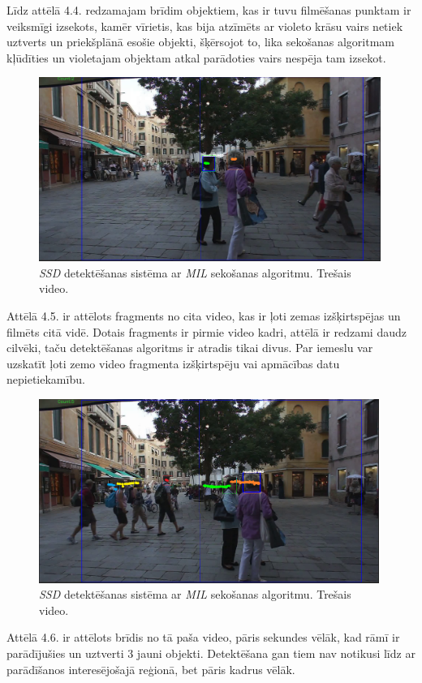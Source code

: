 Līdz attēlā 4.4. redzamajam brīdim objektiem, kas ir tuvu filmēšanas punktam ir veiksmīgi izsekots, kamēr vīrietis, kas bija atzīmēts ar violeto krāsu vairs netiek uztverts un priekšplānā esošie objekti, šķērsojot to, lika sekošanas algoritmam kļūdīties un violetajam objektam atkal parādoties vairs nespēja tam izsekot. 

\begin{figure}[h]%
	\centering
	\includegraphics[height=6cm]{images/ssd5.png} %
	\caption{\textit{SSD} detektēšanas sistēma ar \textit{MIL} sekošanas algoritmu. Trešais video.}%
	\label{fig:example}%
\end{figure}

Attēlā 4.5. ir attēlots fragments no cita video, kas ir ļoti zemas izšķirtspējas un filmēts citā vidē. Dotais fragments ir pirmie video kadri, attēlā ir redzami daudz cilvēki, taču detektēšanas algoritms ir atradis tikai divus. Par iemeslu var uzskatīt ļoti zemo video fragmenta izšķirtspēju vai apmācības datu nepietiekamību.

\begin{figure}[h]%
	\centering
	\includegraphics[height=6cm]{images/ssd6.png} %
	\caption{\textit{SSD} detektēšanas sistēma ar \textit{MIL} sekošanas algoritmu. Trešais video.}%
	\label{fig:example}%
\end{figure}

Attēlā 4.6. ir attēlots brīdis no tā paša video, pāris sekundes vēlāk, kad rāmī ir parādījušies un uztverti 3 jauni objekti. Detektēšana gan tiem nav notikusi līdz ar parādīšanos interesējošajā reģionā, bet pāris kadrus vēlāk. 

